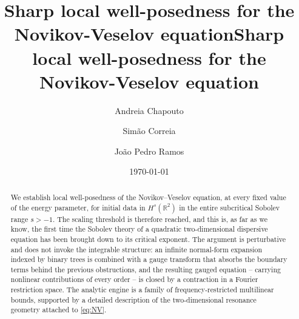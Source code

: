 \documentclass[a4paper,
11pt,  reqno]{amsart}
\title{Sharp local well-posedness for the Novikov-Veselov equation}
\title[Sharp LWP for the Novikov-Veselov equation]{Sharp local well-posedness for the Novikov-Veselov equation}
\author[A.~Chapouto \and S.~Correia \and J.~P.~Ramos]
{Andreia Chapouto \and Sim\~ao Correia \and Jo\~ao Pedro Ramos}
\date{\today}
\newcommand{\5}{\textup{V}}
\theoremstyle{remark}
\newcommand{\R}{\mathbb{R}}
\numberwithin{equation}{section}
\numberwithin{theorem}{section}
\begin{document}
\begin{abstract}
We establish local well-posedness of the Novikov--Veselov equation, at every fixed value of the energy parameter, for initial data in $H^s(\R^2)$ in the entire subcritical Sobolev range $s>-1$. The scaling threshold is therefore reached, and this is, as far as we know, the first time the Sobolev theory of a quadratic two-dimensional dispersive equation has been brought down to its critical exponent. The argument is perturbative and does not invoke the integrable structure: an infinite normal-form expansion indexed by binary trees is combined with a gauge transform that absorbs the boundary terms behind the previous obstructions, and the resulting gauged equation -- carrying nonlinear contributions of every order -- is closed by a contraction in a Fourier restriction space. The analytic engine is a family of frequency-restricted multilinear bounds, supported by a detailed description of the two-dimensional resonance geometry attached to \eqref{eq:NV}.
\end{abstract}

\maketitle
%
\end{document}
